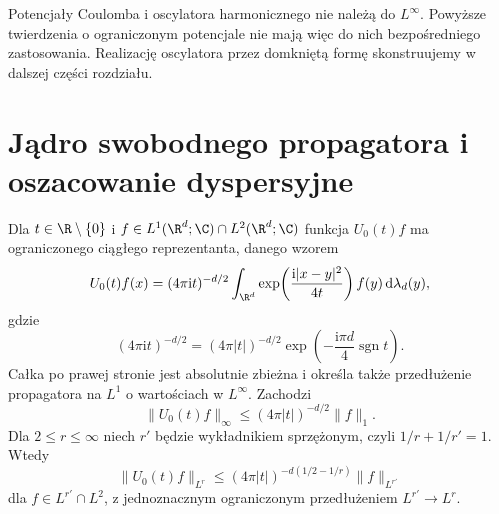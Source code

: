 \begin{uwaga}
Potencjały Coulomba i oscylatora harmonicznego nie
należą do $L^\infty$. Powyższe twierdzenia o
ograniczonym potencjale nie mają więc do nich
bezpośredniego zastosowania. Realizację oscylatora
przez domkniętą formę skonstruujemy w dalszej części
rozdziału.
\end{uwaga}

\section{Jądro swobodnego propagatora i oszacowanie dyspersyjne}
\begin{twierdzenie}
\label{thm:pde22-disp}
Dla $t\in\R\setminus\{0\}$ i
$f\in L^1(\R^d;\C)\cap L^2(\R^d;\C)$ funkcja
$U_0(t)f$ ma ograniczonego ciągłego reprezentanta,
danego wzorem
\begin{equation}\label{eq:pde22-kernel}
 U_0(t)f(x)=(4\pi\mathrm it)^{-d/2}
 \int_{\R^d}\exp\!\left(\frac{\mathrm i|x-y|^2}{4t}\right)
 f(y)\,\mathrm d\lambda_d(y),
\end{equation}
gdzie
\[
 (4\pi\mathrm it)^{-d/2}
 =(4\pi|t|)^{-d/2}
 \exp\!\left(-\frac{\mathrm i\pi d}{4}\operatorname{sgn}t\right).
\]
Całka po prawej stronie jest absolutnie zbieżna
i określa także przedłużenie propagatora na $L^1$
o wartościach w $L^\infty$. Zachodzi
\begin{equation}\label{eq:pde22-L1Linf}
 \|U_0(t)f\|_\infty\le(4\pi|t|)^{-d/2}\|f\|_1.
\end{equation}
Dla $2\le r\le\infty$ niech $r'$ będzie
wykładnikiem sprzężonym, czyli $1/r+1/r'=1$.
Wtedy
\[
 \|U_0(t)f\|_{L^r}
 \le (4\pi|t|)^{-d(1/2-1/r)}\|f\|_{L^{r'}}
\]
dla $f\in L^{r'}\cap L^2$, z jednoznacznym
ograniczonym przedłużeniem $L^{r'}\to L^r$.
\end{twierdzenie}
